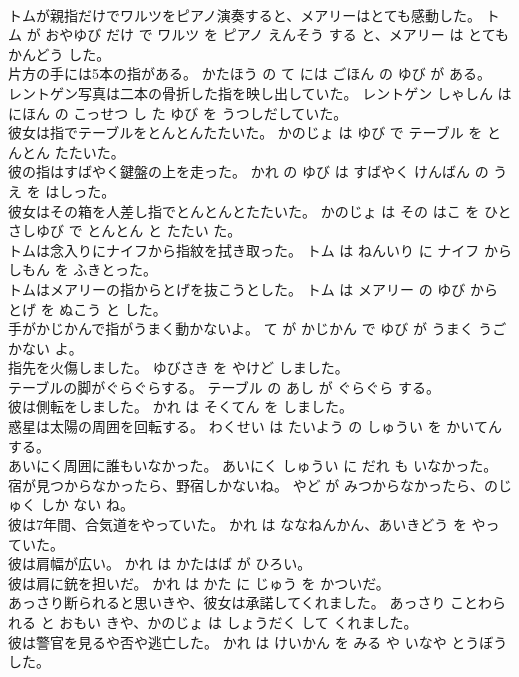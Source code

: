 \documentclass[8pt]{extreport}
\begin{document}
\begin{CJK}{UTF8}{min}
\\	トムが親指だけでワルツをピアノ演奏すると、メアリーはとても感動した。	トム が おやゆび だけ で ワルツ を ピアノ えんそう する と、メアリー は とても かんどう した。	
\\	片方の手には5本の指がある。	かたほう の て には ごほん の ゆび が ある。	
\\	レントゲン写真は二本の骨折した指を映し出していた。	レントゲン しゃしん は にほん の こっせつ し た ゆび を うつしだしていた。	
\\	彼女は指でテーブルをとんとんたたいた。	かのじょ は ゆび で テーブル を とんとん たたいた。	
\\	彼の指はすばやく鍵盤の上を走った。	かれ の ゆび は すばやく けんばん の うえ を はしった。	
\\	彼女はその箱を人差し指でとんとんとたたいた。	かのじょ は その はこ を ひとさしゆび で とんとん と たたい た。	
\\	トムは念入りにナイフから指紋を拭き取った。	トム は ねんいり に ナイフ から しもん を ふきとった。	
\\	トムはメアリーの指からとげを抜こうとした。	トム は メアリー の ゆび から とげ を ぬこう と した。	
\\	手がかじかんで指がうまく動かないよ。	て が かじかん で ゆび が うまく うごかない よ。	
\\	指先を火傷しました。	ゆびさき を やけど しました。	
\\	テーブルの脚がぐらぐらする。	テーブル の あし が ぐらぐら する。	
\\	彼は側転をしました。	かれ は そくてん を しました。	
\\	惑星は太陽の周囲を回転する。	わくせい は たいよう の しゅうい を かいてん する。	
\\	あいにく周囲に誰もいなかった。	あいにく しゅうい に だれ も いなかった。	
\\	宿が見つからなかったら、野宿しかないね。	やど が みつからなかったら、のじゅく しか ない ね。	
\\	彼は7年間、合気道をやっていた。	かれ は ななねんかん、あいきどう を やっていた。	
\\	彼は肩幅が広い。	かれ は かたはば が ひろい。	
\\	彼は肩に銃を担いだ。	かれ は かた に じゅう を かついだ。	
\\	あっさり断られると思いきや、彼女は承諾してくれました。	あっさり ことわられる と おもい きや、かのじょ は しょうだく して くれました。	
\\	彼は警官を見るや否や逃亡した。	かれ は けいかん を みる や いなや とうぼう した。	

\end{CJK}
\end{document}
